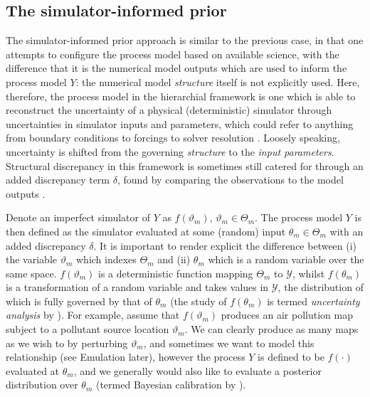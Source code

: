 \documentclass[10pt,a4paper]{article}
\begin{document}
\subsection{The simulator-informed prior}\label{sec:mip}

The simulator-informed prior approach is similar to the previous case, in that one attempts to configure the process model based on available science, with the difference that it is the numerical model outputs which are used to inform the process model $Y$: the numerical model \emph{structure} itself is not explicitly used.  Here, therefore, the process model in the hierarchial framework is one which is able to reconstruct the uncertainty of a physical (deterministic) simulator through uncertainties in simulator inputs and parameters, which could refer to anything from boundary conditions to forcings to solver resolution \citep{Goldstein_2009}. Loosely speaking, uncertainty is shifted from the governing \emph{structure} to the \emph{input parameters}. Structural discrepancy in this framework is sometimes still catered for through an added discrepancy term $\delta$, found by comparing the observations to the model outputs \citep{Kennedy_2001}.

Denote an imperfect simulator of $Y$ as $f(\vartheta_m)$, $\vartheta_m \in \Theta_m$. The process model $Y$ is then defined as the simulator evaluated at some (random) input $\theta_m \in \Theta_m$ with an added discrepancy $\delta$. It is important to render explicit the difference between (i) the variable $\vartheta_m$ which indexes $\Theta_m$ and (ii) $\theta_m$ which is a random variable over the same space. $f(\vartheta_m)$ is a deterministic function mapping $\Theta_m$ to $\mathcal{Y}$, whilst $f(\theta_m)$ is a transformation of a random variable and takes values in $\mathcal{Y}$, the distribution of which is fully governed by that of $\theta_m$ (the study of $f(\theta_m)$ is termed \emph{uncertainty analysis} by \cite{OHagan_1998}). For example, assume that $f(\vartheta_m)$ produces an air pollution map subject to a pollutant source location $\vartheta_m$. We can clearly produce as many maps as we wish to by perturbing $\vartheta_m$, and sometimes we want to model this relationship (see Emulation later), however the process $Y$ is defined to be $f(\cdot)$ evaluated at $\theta_m$, and we generally would also like to evaluate a posterior distribution over $\theta_m$ (termed Bayesian calibration by \cite{Kennedy_2001}). 
\end{document}
